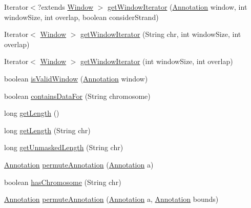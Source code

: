 \begin{DoxyCompactItemize}
\item 
Iterator$<$?extends \hyperlink{interfaceumms_1_1core_1_1feature_1_1_window}{Window} $>$ \hyperlink{classumms_1_1core_1_1coordinatesystem_1_1_genomic_space_a92f232940d1bd938e6ead9c8780e8b17}{get\+Window\+Iterator} (\hyperlink{interfaceumms_1_1core_1_1annotation_1_1_annotation}{Annotation} window, int window\+Size, int overlap, boolean consider\+Strand)
\item 
Iterator$<$ \hyperlink{interfaceumms_1_1core_1_1feature_1_1_window}{Window} $>$ \hyperlink{classumms_1_1core_1_1coordinatesystem_1_1_genomic_space_a0059d839bd5849142644aa4cb1770dd5}{get\+Window\+Iterator} (String chr, int window\+Size, int overlap)
\item 
Iterator$<$ \hyperlink{interfaceumms_1_1core_1_1feature_1_1_window}{Window} $>$ \hyperlink{classumms_1_1core_1_1coordinatesystem_1_1_genomic_space_aefc8258ac12034e853762e0d921d4058}{get\+Window\+Iterator} (int window\+Size, int overlap)
\item 
boolean \hyperlink{classumms_1_1core_1_1coordinatesystem_1_1_genomic_space_ac9bb06d851f3ce97d435b2af47a05b7e}{is\+Valid\+Window} (\hyperlink{interfaceumms_1_1core_1_1annotation_1_1_annotation}{Annotation} window)
\item 
boolean \hyperlink{classumms_1_1core_1_1coordinatesystem_1_1_genomic_space_afff244ec46e14018c2e7d7114ec266cb}{contains\+Data\+For} (String chromosome)
\item 
long \hyperlink{classumms_1_1core_1_1coordinatesystem_1_1_genomic_space_aff9d1bad2aa51c3896bc90fafd5c6a42}{get\+Length} ()
\item 
long \hyperlink{classumms_1_1core_1_1coordinatesystem_1_1_genomic_space_a08e8fc02a08d305b261703c804721860}{get\+Length} (String chr)
\item 
long \hyperlink{classumms_1_1core_1_1coordinatesystem_1_1_genomic_space_a8f86806abc96d49a209969abee97be5e}{get\+Unmasked\+Length} (String chr)
\item 
\hyperlink{interfaceumms_1_1core_1_1annotation_1_1_annotation}{Annotation} \hyperlink{classumms_1_1core_1_1coordinatesystem_1_1_genomic_space_a729042a51c379aad9b024c8b7943399f}{permute\+Annotation} (\hyperlink{interfaceumms_1_1core_1_1annotation_1_1_annotation}{Annotation} a)
\item 
boolean \hyperlink{classumms_1_1core_1_1coordinatesystem_1_1_genomic_space_ad5c53a738849d61eb01ab450d2725cde}{has\+Chromosome} (String chr)
\item 
\hyperlink{interfaceumms_1_1core_1_1annotation_1_1_annotation}{Annotation} \hyperlink{classumms_1_1core_1_1coordinatesystem_1_1_genomic_space_a3096f1aa961085946b4e9481de1e95af}{permute\+Annotation} (\hyperlink{interfaceumms_1_1core_1_1annotation_1_1_annotation}{Annotation} a, \hyperlink{interfaceumms_1_1core_1_1annotation_1_1_annotation}{Annotation} bounds)

\end{DoxyCompactItemize}
